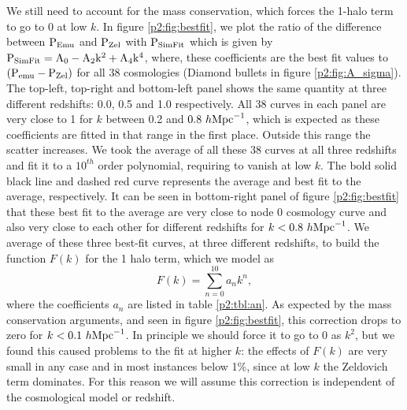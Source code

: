 \documentclass[
  11pt,
  twoside,
  openright,
  titlepage,
  headings=optiontoheadandtoc
]{scrbook}
\begin{document}
\clearpage

We still need to account for the mass conservation, which forces the 1-halo term to go to 0 at low $k$. 
In figure \ref{p2:fig:bestfit}, we plot the ratio of the difference between $\rm{P_{Emu}}$ and $\rm{P_{Zel}}$ with $\rm{P_{SimFit}}$ which is given by
	$\rm{P_{SimFit}} = A_0 - A_2k^2 + A_4 k^4$, 
where, these coefficients are the best fit values to $(\rm{P_{emu} - P_{Zel}})$ for all 38 cosmologies (Diamond bullets in figure \ref{p2:fig:A_sigma}). The top-left, top-right and bottom-left panel shows the same quantity at three different redshifts: 0.0, 0.5 and 1.0 respectively. All 38 curves in each panel are very close to 1 for $k$ between 0.2 and $0.8 \ h \rm{Mpc}^{-1}$, which is expected as these coefficients are fitted in that range in the first place. Outside this range the scatter increases. We took the average of all these 38 curves at all three redshifts and fit it to a $10^{th}$ 
order polynomial, requiring to vanish at low $k$. 
The bold solid black line and dashed red curve represents the average and best fit to the average, respectively. 
It can be seen in bottom-right panel of figure \ref{p2:fig:bestfit} that these best fit to the average are very close to node 0 cosmology curve and also very close to each other for different redshifts for $k<0.8 \ h \rm{Mpc}^{-1}$. 
We average of these three best-fit curves, at three different redshifts, to build the function $F(k)$ for the 1 halo term, 
which we model as
\begin{equation}
	F(k) = \sum_{n=0}^{10} a_n k^n, 
\label{p2:eqn:fk}
\end{equation}
where the coefficients $a_n$ are listed in table \ref{p2:tbl:an}. 
As expected by the mass conservation arguments, and seen in figure \ref{p2:fig:bestfit},
this correction drops to zero for $k<0.1\ h \rm{Mpc}^{-1}$. 
In principle we should force it to go to 0 as $k^2$, but we found this caused problems to 
the fit at higher $k$: the effects of $F(k)$ are very small in any case and in most instances below 1\%, since
at low $k$ the Zeldovich term dominates. 
For this reason we will assume this correction is 
independent of the cosmological model or redshift. 

\begin{table}[p]
\begin{center}
\caption{Coefficients to calculate the correction function, equation \ref{p2:eqn:fk}.
The units of the coefficient $a_n$ is $(\rm{Mpc}/h)^n$.}
\label{p2:tbl:an}
\end{center}
\end{table}
\end{document}
